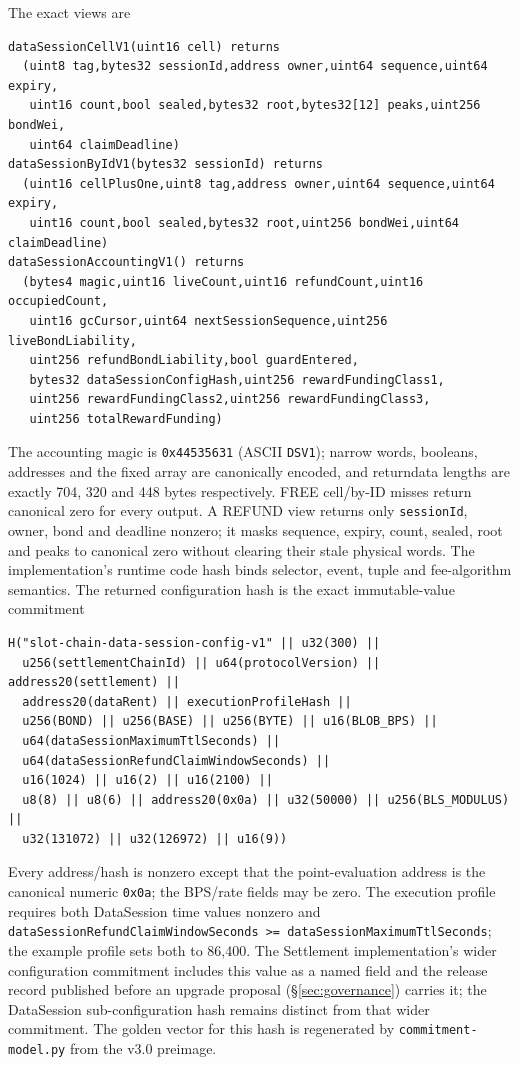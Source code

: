 \documentclass[a4paper,11pt]{article}
\newcommand{\code}[1]{\nolinkurl{#1}}
\begin{document}
The exact views are
\begin{verbatim}
dataSessionCellV1(uint16 cell) returns
  (uint8 tag,bytes32 sessionId,address owner,uint64 sequence,uint64 expiry,
   uint16 count,bool sealed,bytes32 root,bytes32[12] peaks,uint256 bondWei,
   uint64 claimDeadline)
dataSessionByIdV1(bytes32 sessionId) returns
  (uint16 cellPlusOne,uint8 tag,address owner,uint64 sequence,uint64 expiry,
   uint16 count,bool sealed,bytes32 root,uint256 bondWei,uint64 claimDeadline)
dataSessionAccountingV1() returns
  (bytes4 magic,uint16 liveCount,uint16 refundCount,uint16 occupiedCount,
   uint16 gcCursor,uint64 nextSessionSequence,uint256 liveBondLiability,
   uint256 refundBondLiability,bool guardEntered,
   bytes32 dataSessionConfigHash,uint256 rewardFundingClass1,
   uint256 rewardFundingClass2,uint256 rewardFundingClass3,
   uint256 totalRewardFunding)
\end{verbatim}
The accounting magic is \code{0x44535631} (ASCII \code{DSV1}); narrow words,
booleans, addresses and the fixed array are canonically encoded, and returndata
lengths are exactly 704, 320 and 448 bytes respectively.  FREE cell/by-ID misses
return canonical zero for every output.  A REFUND view returns only
\code{sessionId}, owner, bond and deadline nonzero; it masks sequence, expiry,
count, sealed, root and peaks to canonical zero without clearing their stale
physical words.  The implementation's runtime code hash binds selector,
event, tuple and fee-algorithm semantics.  The returned configuration hash is
the exact immutable-value commitment
\begin{verbatim}
H("slot-chain-data-session-config-v1" || u32(300) ||
  u256(settlementChainId) || u64(protocolVersion) || address20(settlement) ||
  address20(dataRent) || executionProfileHash ||
  u256(BOND) || u256(BASE) || u256(BYTE) || u16(BLOB_BPS) ||
  u64(dataSessionMaximumTtlSeconds) ||
  u64(dataSessionRefundClaimWindowSeconds) ||
  u16(1024) || u16(2) || u16(2100) ||
  u8(8) || u8(6) || address20(0x0a) || u32(50000) || u256(BLS_MODULUS) ||
  u32(131072) || u32(126972) || u16(9))
\end{verbatim}
Every address/hash is nonzero except that the point-evaluation address is the
canonical numeric \code{0x0a}; the BPS/rate fields may be zero.  The
execution profile requires both DataSession time values nonzero and
\code{dataSessionRefundClaimWindowSeconds >= dataSessionMaximumTtlSeconds}; the
example profile sets both to 86,400.  The Settlement implementation's wider
configuration commitment includes this value as a named field and the release
record published before an upgrade proposal (\S\ref{sec:governance}) carries
it; the DataSession sub-configuration hash remains distinct from that wider
commitment.  The golden vector for this hash is regenerated by
\code{commitment-model.py} from the v3.0 preimage.
\end{document}
